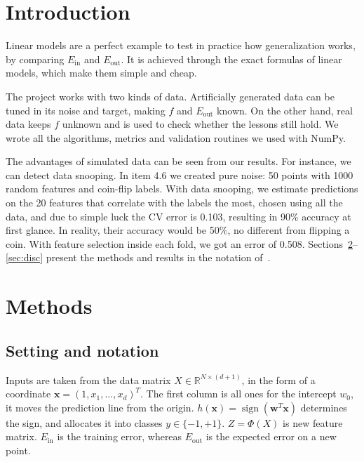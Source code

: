 \documentclass[conference]{IEEEtran}
\newcommand{\Ein}{E_{\mathrm{in}}}
\newcommand{\Eout}{E_{\mathrm{out}}}
\begin{document}
\section{Introduction}
Linear models are a perfect example to test in practice how generalization works, by comparing $\Ein$ and $\Eout$. It is achieved through the exact formulas of linear models, which make them simple and cheap.

The project works with two kinds of data. Artificially generated data can be tuned in its noise and target, making $f$ and $\Eout$ known. On the other hand, real data keeps $f$ unknown and is used to check whether the lessons still hold. We wrote all the algorithms, metrics and validation routines we used with NumPy.

The advantages of simulated data can be seen from our results. For instance, we can detect data snooping. In item 4.6 we created pure noise: 50 points with 1000 random features and coin-flip labels. With data snooping, we estimate predictions on the 20 features that correlate with the labels the most, chosen using all the data, and due to simple luck the CV error is 0.103, resulting in 90\% accuracy at first glance. In reality, their accuracy would be 50\%, no different from flipping a coin. With feature selection inside each fold, we got an error of 0.508. Sections~\ref{sec:methods}--\ref{sec:disc} present the methods and results in the notation of~\cite{lfd}.


\section{Methods}\label{sec:methods}

\subsection{Setting and notation}
Inputs are taken from the data matrix $X\in\mathbb{R}^{N\times(d+1)}$, in the form of a coordinate $\mathbf{x}=(1,x_1,\dots,x_d)^T$. The first column is all ones for the intercept $w_0$, it moves the prediction line from the origin. \(h(\mathbf{x})=\operatorname{sign}(\mathbf{w}^T\mathbf{x})\) determines the sign, and allocates it into classes $y\in\{-1,+1\}$. $Z=\Phi(X)$ is new feature matrix. $E_{\mathrm{in}}$ is the training error, whereas $E_{\mathrm{out}}$ is the expected error on a new point.
\end{document}
